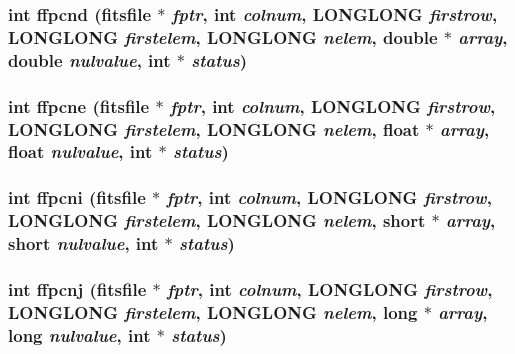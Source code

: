 \subsubsection{\setlength{\rightskip}{0pt plus 5cm}int ffpcnd (\bf{fitsfile} $\ast$ {\em fptr}, int {\em colnum}, \bf{LONGLONG} {\em firstrow}, \bf{LONGLONG} {\em firstelem}, \bf{LONGLONG} {\em nelem}, double $\ast$ {\em array}, double {\em nulvalue}, int $\ast$ {\em status})}\label{test_2roimasker_2fitsio_8h_521f9cb2a81ba66277d032513255e1f6}


\subsubsection{\setlength{\rightskip}{0pt plus 5cm}int ffpcne (\bf{fitsfile} $\ast$ {\em fptr}, int {\em colnum}, \bf{LONGLONG} {\em firstrow}, \bf{LONGLONG} {\em firstelem}, \bf{LONGLONG} {\em nelem}, float $\ast$ {\em array}, float {\em nulvalue}, int $\ast$ {\em status})}\label{test_2roimasker_2fitsio_8h_e90f56227753bb7883ba1b42e31a5f00}


\subsubsection{\setlength{\rightskip}{0pt plus 5cm}int ffpcni (\bf{fitsfile} $\ast$ {\em fptr}, int {\em colnum}, \bf{LONGLONG} {\em firstrow}, \bf{LONGLONG} {\em firstelem}, \bf{LONGLONG} {\em nelem}, short $\ast$ {\em array}, short {\em nulvalue}, int $\ast$ {\em status})}\label{test_2roimasker_2fitsio_8h_282b5e2033ea5cfb0c4b5dfaecde95d7}


\subsubsection{\setlength{\rightskip}{0pt plus 5cm}int ffpcnj (\bf{fitsfile} $\ast$ {\em fptr}, int {\em colnum}, \bf{LONGLONG} {\em firstrow}, \bf{LONGLONG} {\em firstelem}, \bf{LONGLONG} {\em nelem}, long $\ast$ {\em array}, long {\em nulvalue}, int $\ast$ {\em status})}\label{test_2roimasker_2fitsio_8h_84de8caa3460cd6bb387c389b9a684d9}


